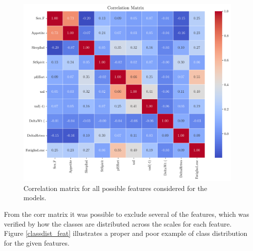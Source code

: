 \documentclass[conference]{IEEEtran}
\begin{document}
\begin{figure}[H]
    \centering
    \includegraphics[width=1\linewidth]{assets/correlation_matrix.png}
    \caption{Correlation matrix for all possible features considered for the models.}
    \label{fig:correlationMatrix}
\end{figure}

From the corr matrix it was possible to exclude several of the features, which was verified by how the classes are distributed across the scales for each feature. Figure \ref{classdist_feat} illustrates a proper and poor example of class distribution for the given features.
\end{document}
